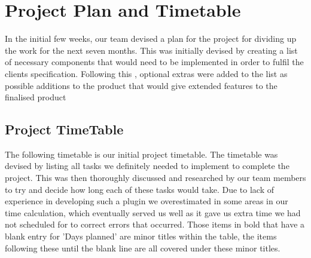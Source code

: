 \section{Project Plan and Timetable}
In the initial few weeks, our team devised a plan for the project for dividing up the work for the next seven months. This was initially devised by creating a list of necessary components that would need to be implemented in order to fulfil the clients specification. Following this , optional extras were added to the list as possible additions to the product that would give extended features to the finalised product

\subsection{Project TimeTable}
The following timetable is our initial project timetable. The timetable was devised by listing all tasks we definitely needed to implement to complete the project. This was then thoroughly discussed and researched by our team members to try and decide how long each of these tasks would take. Due to lack of experience in developing such a plugin we overestimated in some areas in our time calculation, which eventually served us well as it gave us extra time we had not scheduled for to correct errors that occurred. Those items in bold that have a blank entry for 'Days planned' are minor titles within the table, the items following these until the blank line are all covered under these minor titles. 
